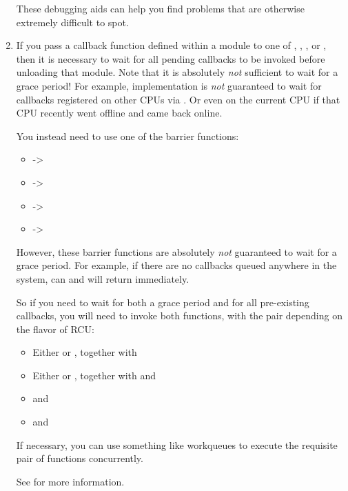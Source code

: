 \begin{enumerate}[start=0]

	These debugging aids can help you find problems that are
	otherwise extremely difficult to spot.

\item	If you pass a callback function defined within a module
	to one of , , , or
	, then it is necessary to wait for all
	pending callbacks to be invoked before unloading that module.
	Note that it is absolutely \emph{not} sufficient to wait for a grace
	period!
	For example,  implementation is \emph{not}
	guaranteed to wait for callbacks registered on other CPUs via
	.
	Or even on the current CPU if that CPU recently
	went offline and came back online.

	You instead need to use one of the barrier functions:

	\begin{itemize}
	\item	{} -> 
	\item	{} -> 
	\item	{} -> 
	\item	{} -> 
        \end{itemize}

	However, these barrier functions are absolutely \emph{not} guaranteed
	to wait for a grace period.
	For example, if there are no
	 callbacks queued anywhere in the system, 
	can and will return immediately.

	So if you need to wait for both a grace period and for all
	pre-existing callbacks, you will need to invoke both functions,
	with the pair depending on the flavor of RCU\@:

        \begin{itemize}
	\item	Either  or ,
		together with 
	\item	Either  or ,
		together with and 
	\item	{} and 
	\item	{} and 
	\end{itemize}

	If necessary, you can use something like workqueues to execute
	the requisite pair of functions concurrently.

	See  for more information.
\end{enumerate}
